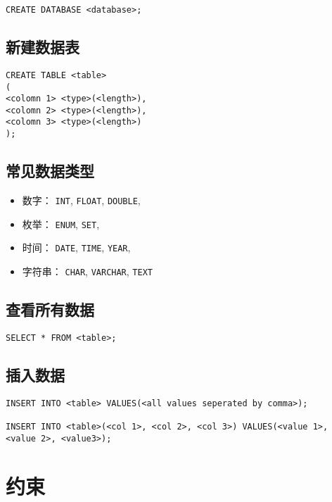 \documentclass[a4paper, twoside]{article}
\newcommand{\tightlist}{%
  \setlength{\itemsep}{0pt}\setlength{\parskip}{0pt}}
\begin{document}
\begin{verbatim}
CREATE DATABASE <database>;
\end{verbatim}

\subsection{新建数据表}

\begin{verbatim}
CREATE TABLE <table>
(
<colomn 1> <type>(<length>),
<colomn 2> <type>(<length>),
<colomn 3> <type>(<length>)
);
\end{verbatim}

\subsection{常见数据类型}

\begin{itemize}
\tightlist
\item
  数字： \texttt{INT}, \texttt{FLOAT}, \texttt{DOUBLE},
\item
  枚举： \texttt{ENUM}, \texttt{SET},
\item
  时间： \texttt{DATE}, \texttt{TIME}, \texttt{YEAR},
\item
  字符串： \texttt{CHAR}, \texttt{VARCHAR}, \texttt{TEXT}
\end{itemize}

\subsection{查看所有数据}

\begin{verbatim}
SELECT * FROM <table>;
\end{verbatim}

\subsection{插入数据}

\begin{verbatim}
INSERT INTO <table> VALUES(<all values seperated by comma>);

INSERT INTO <table>(<col 1>, <col 2>, <col 3>) VALUES(<value 1>, <value 2>, <value3>);
\end{verbatim}

\section{约束}
\end{document}
